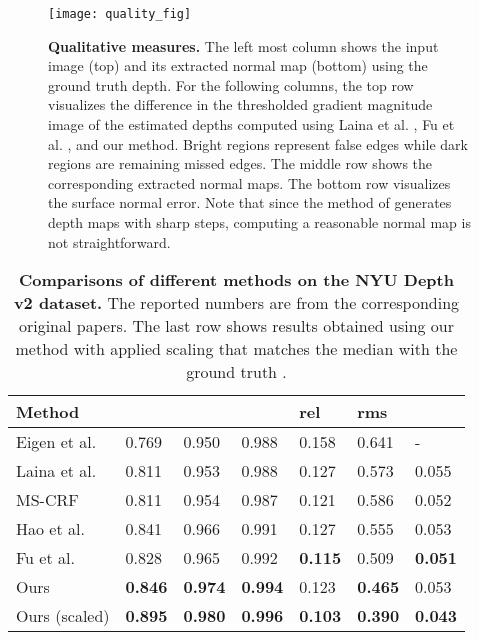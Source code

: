 \documentclass[10pt,twocolumn,letterpaper]{article}
\begin{document}
\begin{figure*}[t]
\begin{center}
\texttt{[image: quality\_fig]}
\end{center}
   \caption{\textbf{Qualitative measures.} The left most column shows the input image (top) and its extracted normal map (bottom) using the ground truth depth. For the following columns, the top row visualizes the difference in the thresholded gradient magnitude image of the estimated depths computed using Laina et al. \cite{Laina2016}, Fu et al. \cite{Fu2018DeepOR}, and our method. Bright regions represent false edges while dark regions are remaining missed edges. The middle row shows the corresponding extracted normal maps. The bottom row visualizes the surface normal error. Note that since the method of \cite{Fu2018DeepOR} generates depth maps with sharp steps, computing a reasonable normal map is not straightforward. }
\label{fig:qualitative}
\end{figure*}



\begin{table*}[t]
\centering
\begin{tabular}{l|lll|lll}
\toprule
Method         &  &  &  & rel   & rms   &   \\ 
\midrule
Eigen et al. \cite{Eigen2014}    & 0.769  & 0.950  & 0.988 & 0.158 & 0.641 & -   \\
Laina et al. \cite{Laina2016}    & 0.811  & 0.953  & 0.988 & 0.127 & 0.573 & 0.055   \\
MS-CRF \cite{Xu2017}             & 0.811  & 0.954  & 0.987 & 0.121 & 0.586 & 0.052   \\
Hao et al. \cite{Hao2018DetailPD}& 0.841  & 0.966  & 0.991 & 0.127 & 0.555 & 0.053   \\
Fu et al. \cite{Fu2018DeepOR}    & 0.828  & 0.965  & 0.992 & \textbf{0.115} & 0.509 & \textbf{0.051}   \\
Ours                   & \textbf{0.846}  &  \textbf{0.974}  &  \textbf{0.994} &  0.123  &  \textbf{0.465} &  0.053   \\
\midrule
Ours (scaled)      & \textbf{0.895}  &  \textbf{0.980}  &  \textbf{0.996} &  \textbf{0.103}  &  \textbf{0.390} &  \textbf{0.043}   \\
\bottomrule
\end{tabular}
\bigskip
\caption{\textbf{Comparisons of different methods on the NYU Depth v2 dataset.} The reported numbers are from the corresponding original papers. The last row shows results obtained using our method with applied scaling that matches the median with the ground truth \cite{Zhou2017}. }
\label{tab:1}
\end{table*}
\end{document}
